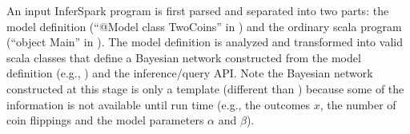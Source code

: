 An input InferSpark program is first parsed and separated into two parts: 
the model definition (``{\sf @Model} class TwoCoins'' in 
) and
the ordinary scala program (``{\sf object Main}'' in
). The model definition is analyzed and
transformed into valid scala classes that define a Bayesian
network constructed from the model definition 
(e.g., ) and the inference/query API.
Note the Bayesian network
constructed at this stage is only a template (different than 
) because some of the information is not available 
until run time (e.g., the outcomes $x$, the number of coin flippings 
and the model parameters $\alpha$ and $\beta$). 
%
%
%

